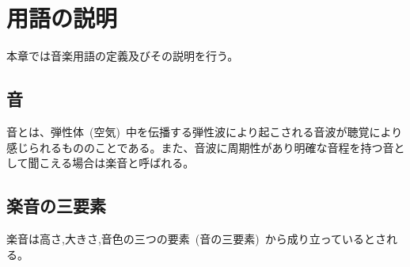 \chapter{用語の説明}

本章では音楽用語の定義及びその説明を行う。

\section{音}

音とは、弾性体~(空気)~中を伝播する弾性波により起こされる音波が聴覚により感じられるもののことである。また、音波に周期性があり明確な音程を持つ音として聞こえる場合は楽音と呼ばれる。

\section{楽音の三要素}

楽音は高さ,大きさ,音色の三つの要素~(音の三要素)~から成り立っているとされる。

